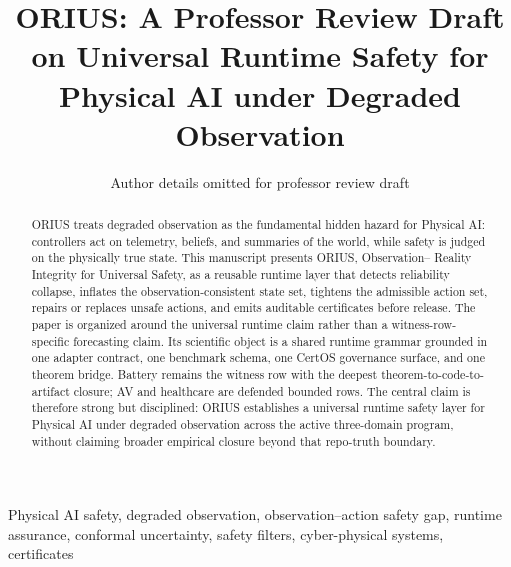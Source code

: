 \documentclass[10pt,journal]{IEEEtran}
\title{ORIUS: A Professor Review Draft on Universal Runtime Safety for Physical AI under Degraded Observation}
\author{Author details omitted for professor review draft}
\date{}
\begin{document}
\hypersetup{pageanchor=false}
\maketitle

\begin{abstract}
ORIUS treats degraded observation as the fundamental hidden hazard for Physical AI:
controllers act on telemetry, beliefs, and summaries of the world, while safety is
judged on the physically true state. This manuscript presents ORIUS, Observation--
Reality Integrity for Universal Safety, as a reusable runtime layer that detects
reliability collapse, inflates the observation-consistent state set, tightens the
admissible action set, repairs or replaces unsafe actions, and emits auditable
certificates before release. The paper is organized around the universal runtime
claim rather than a witness-row-specific forecasting claim.
Its scientific object is a shared runtime grammar grounded in one adapter contract, one
benchmark schema, one CertOS governance surface, and one theorem bridge. Battery
remains the witness row with the deepest theorem-to-code-to-artifact closure; AV and
healthcare are defended bounded rows. The central claim is therefore strong but
disciplined: ORIUS establishes a universal runtime safety layer for Physical AI under
degraded observation across the active three-domain program, without claiming broader
empirical closure beyond that repo-truth boundary.
\end{abstract}

\begin{IEEEkeywords}
Physical AI safety, degraded observation, observation--action safety gap, runtime
assurance, conformal uncertainty, safety filters, cyber-physical systems, certificates
\end{IEEEkeywords}













\newpage
\nocite{*}


\end{document}
